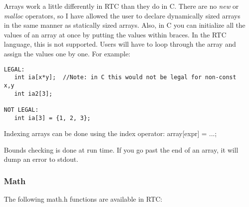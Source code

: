 \noindent Arrays work a little differently in RTC than they do in C. There are
no \emph{new} or \emph{malloc} operators, so I have allowed the user to 
declare dynamically sized arrays in the same manner as statically sized 
arrays. Also, in C you can initialize all the values of an array at once by
putting the values within braces. In the RTC language, this is not supported.
Users will have to loop through the array and assign the values one by one.
For example:

{\ttfamily \begin{verbatim}
LEGAL:
   int ia[x*y];  //Note: in C this would not be legal for non-const x,y
   int ia2[3];

NOT LEGAL:
   int ia[3] = {1, 2, 3};
\end{verbatim}
}

\noindent Indexing arrays can be done using the index operator:
array[expr] = ...;

\noindent Bounds checking is done at run time. If you go past the end of an 
array, it will dump an error to stdout. 

\subsubsection{Math}

The following math.h functions are available in RTC:


